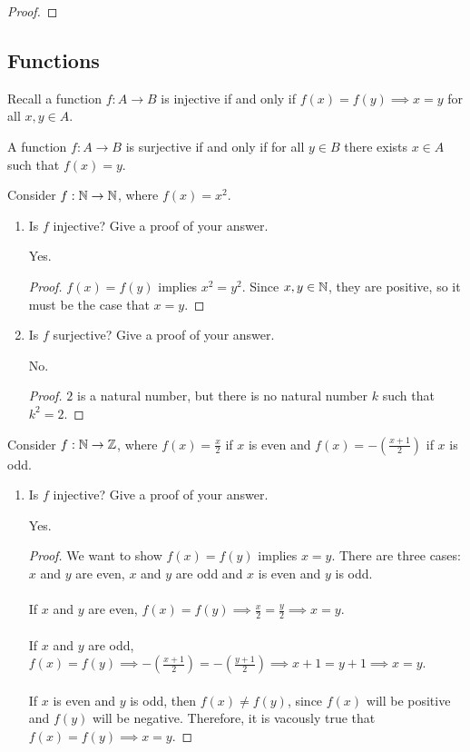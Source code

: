 \documentclass[]{exam}
\begin{document}
\begin{questions}
\begin{solution}
\begin{proof}
\end{proof}

\end{solution}


\subsection*{Functions}
Recall a function $f: A \to B$ is injective if and only if $f(x) = f(y) \implies
x = y$ for all $x,y \in A$.

A function $f: A \to B$ is surjective if and only if for all $y \in B$ there
exists $x \in A$ such that $f(x) = y$. 

\question Consider $f: \mathbb{N} \to \mathbb{N}$, where $f(x) = x^2$.

\begin{enumerate}[label=\alph*)]
\item Is $f$ injective? Give a proof of your answer.
\begin{solution}
Yes.
\begin{proof}
$f(x) = f(y)$ implies $x^2 = y^2$. Since $x,y \in \mathbb{N}$, they
are positive, so it must be the case that $x = y$.
\end{proof}


\end{solution}

\item Is $f$ surjective? Give a proof of your answer.
\begin{solution}
No.
\begin{proof}
$2$ is a natural number, but there is no natural number $k$ such that
$k^2 = 2$.
\end{proof}
\end{solution}

\end{enumerate}


\question Consider $f: \mathbb{N} \to \mathbb{Z}$, where $f(x) = \frac{x}{2}$ if $x$ is even
and $f(x) = -\left (\frac{x+1}{2} \right) $ if $x$ is odd.
\begin{enumerate}[label=\alph*)]
\item Is $f$ injective? Give a proof of your answer.
\begin{solution}
Yes.
\begin{proof}
We want to show $f(x) = f(y)$ implies $x = y$. There are three cases:
$x$ and $y$ are even, $x$ and $y$ are odd and $x$ is even and $y$ is odd.
\\~\\
If $x$ and $y$ are even, $f(x) = f(y) \implies \frac{x}{2} = \frac{y}{2}
\implies x = y$.
\\~\\
If $x$ and $y$ are odd, 
$f(x) = f(y) \implies - \left (\frac{x + 1}{2} \right ) = - \left (\frac{y + 1}{2} \right
    ) \implies x + 1 = y + 1 \implies x = y$.
\\~\\
If $x$ is even and $y$ is odd, then $f(x) \neq f(y)$, since $f(x)$ will be
positive and $f(y)$ will be negative. Therefore, it is vacously true that
$f(x) = f(y) \implies x = y$.
\end{proof}



\end{solution}
\end{enumerate}
\end{questions}
\end{document}
